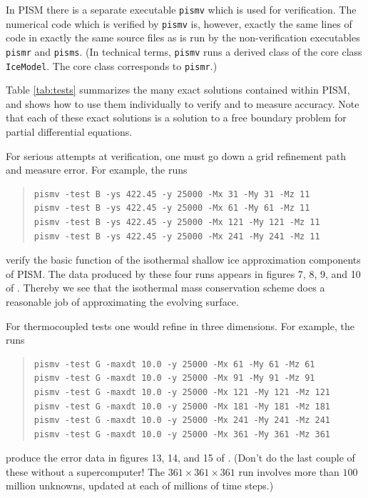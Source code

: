 \documentclass[12pt,final]{amsart}
\begin{document}
In PISM there is a separate executable \verb|pismv| which is used for verification.  The numerical code which is verified by \verb|pismv| is, however, exactly the same lines of code in exactly the same source files as is run by the non-verification executables \verb|pismr| and \verb|pisms|.  (In technical terms, \verb|pismv| runs a derived class of the core class \verb|IceModel|.  The core class corresponds to \verb|pismr|.)

Table \ref{tab:tests} summarizes the many exact solutions contained within PISM, and shows how to use them individually to verify and to measure accuracy.   Note that each of these exact solutions is a solution to a free boundary problem for partial differential equations.

For serious attempts at verification, one must go down a grid refinement path and measure error.  For example, the runs
\begin{quote}\small\begin{verbatim}
pismv -test B -ys 422.45 -y 25000 -Mx 31 -My 31 -Mz 11
pismv -test B -ys 422.45 -y 25000 -Mx 61 -My 61 -Mz 11
pismv -test B -ys 422.45 -y 25000 -Mx 121 -My 121 -Mz 11
pismv -test B -ys 422.45 -y 25000 -Mx 241 -My 241 -Mz 11
\end{verbatim}
\normalsize\end{quote}
verify the basic function of the isothermal shallow ice approximation components of PISM.  The data produced by these four runs appears in figures 7, 8, 9, and 10 of \cite{BLKCB}.  Thereby we see that the isothermal mass conservation scheme does a reasonable job of approximating the evolving surface.

For thermocoupled tests one would refine in three dimensions.  For example, the runs
\begin{quote}\small\begin{verbatim}
pismv -test G -maxdt 10.0 -y 25000 -Mx 61 -My 61 -Mz 61
pismv -test G -maxdt 10.0 -y 25000 -Mx 91 -My 91 -Mz 91
pismv -test G -maxdt 10.0 -y 25000 -Mx 121 -My 121 -Mz 121
pismv -test G -maxdt 10.0 -y 25000 -Mx 181 -My 181 -Mz 181
pismv -test G -maxdt 10.0 -y 25000 -Mx 241 -My 241 -Mz 241
pismv -test G -maxdt 10.0 -y 25000 -Mx 361 -My 361 -Mz 361
\end{verbatim}
\normalsize\end{quote}
produce the error data in figures 13, 14, and 15 of \cite{BBL}.  (Don't do the last couple of these without a supercomputer!  The $361\times 361\times 361$ run involves more than $100$ million unknowns, updated at each of millions of time steps.)
\end{document}
